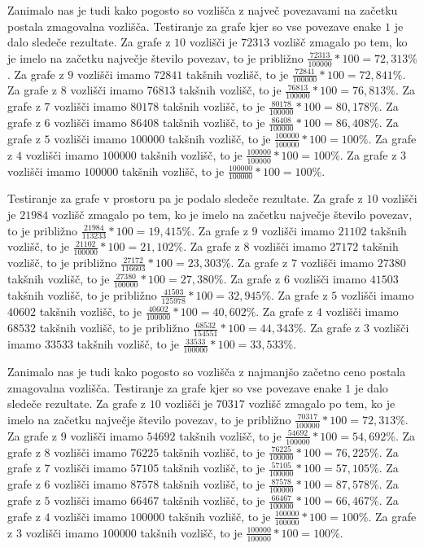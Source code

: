 \documentclass[fin1, tisk]{fmfdelo}
\begin{document}
Zanimalo nas je tudi kako pogosto so vozlišča z največ povezavami na začetku postala zmagovalna vozlišča.
Testiranje za grafe kjer so vse povezave enake $1$ je dalo sledeče rezultate.
Za grafe z $10$ vozlišči je $72313$ vozlišč zmagalo po tem, ko je imelo na začetku največje število povezav, to je približno $\frac{72313}{100000}*100 = 72,313 \%$.
Za grafe z $9$ vozlišči imamo $72841$ takšnih vozlišč, to je $\frac{72841}{100000}*100 = 72,841 \%$.
Za grafe z $8$ vozlišči imamo $76813$ takšnih vozlišč, to je $\frac{76813}{100000}*100 = 76,813 \%$.
Za grafe z $7$ vozlišči imamo $80178$ takšnih vozlišč, to je $\frac{80178}{100000}*100 = 80,178 \%$.
Za grafe z $6$ vozlišči imamo $86408$ takšnih vozlišč, to je $\frac{86408}{100000}*100 = 86,408 \%$.
Za grafe z $5$ vozlišči imamo $100000$ takšnih vozlišč, to je $\frac{100000}{100000}*100 = 100 \%$.
Za grafe z $4$ vozlišči imamo $100000$ takšnih vozlišč, to je $\frac{100000}{100000}*100 = 100 \%$.
Za grafe z $3$ vozlišči imamo $100000$ takšnih vozlišč, to je $\frac{100000}{100000}*100 = 100 \%$.

Testiranje za grafe v prostoru pa je podalo sledeče rezultate.
Za grafe z $10$ vozlišči je $21984$ vozlišč zmagalo po tem, ko je imelo na začetku največje število povezav, to je približno $\frac{21984}{113233}*100 = 19,415 \%$.
Za grafe z $9$ vozlišči imamo $21102$ takšnih vozlišč, to je $\frac{21102}{100000}*100 = 21,102 \%$.
Za grafe z $8$ vozlišči imamo $27172$ takšnih vozlišč, to je približno $\frac{27172}{116603}*100 = 23,303 \%$.
Za grafe z $7$ vozlišči imamo $27380$ takšnih vozlišč, to je $\frac{27380}{100000}*100 = 27,380 \%$.
Za grafe z $6$ vozlišči imamo $41503$ takšnih vozlišč, to je približno $\frac{41503}{125978}*100 = 32,945 \%$.
Za grafe z $5$ vozlišči imamo $40602$ takšnih vozlišč, to je $\frac{40602}{100000}*100 = 40,602 \%$.
Za grafe z $4$ vozlišči imamo $68532$ takšnih vozlišč, to je približno $\frac{68532}{154551}*100 = 44,343 \%$.
Za grafe z $3$ vozlišči imamo $33533$ takšnih vozlišč, to je $\frac{33533}{100000}*100 = 33,533 \%$.




Zanimalo nas je tudi kako pogosto so vozlišča z najmanjšo začetno ceno postala zmagovalna vozlišča.
Testiranje za grafe kjer so vse povezave enake $1$ je dalo sledeče rezultate.
Za grafe z $10$ vozlišči je $70317$ vozlišč zmagalo po tem, ko je imelo na začetku največje število povezav, to je približno $\frac{70317}{100000}*100 = 72,313 \%$.
Za grafe z $9$ vozlišči imamo $54692$ takšnih vozlišč, to je $\frac{54692}{100000}*100 = 54,692 \%$.
Za grafe z $8$ vozlišči imamo $76225$ takšnih vozlišč, to je $\frac{76225}{100000}*100 = 76,225 \%$.
Za grafe z $7$ vozlišči imamo $57105$ takšnih vozlišč, to je $\frac{57105}{100000}*100 = 57,105 \%$.
Za grafe z $6$ vozlišči imamo $87578$ takšnih vozlišč, to je $\frac{87578}{100000}*100 = 87,578 \%$.
Za grafe z $5$ vozlišči imamo $66467$ takšnih vozlišč, to je $\frac{66467}{100000}*100 = 66,467 \%$.
Za grafe z $4$ vozlišči imamo $100000$ takšnih vozlišč, to je $\frac{100000}{100000}*100 = 100 \%$.
Za grafe z $3$ vozlišči imamo $100000$ takšnih vozlišč, to je $\frac{100000}{100000}*100 = 100 \%$.
\end{document}
